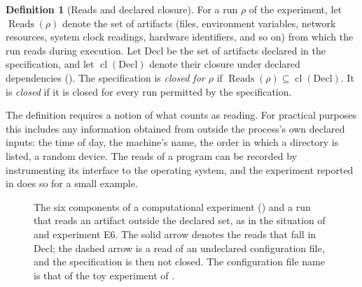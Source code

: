 \documentclass[11pt,twoside,openright]{book}
\theoremstyle{plain}
\theoremstyle{definition}
\newtheorem{definition}[theorem]{Definition}
\theoremstyle{remark}
\DeclareMathOperator{\Cl}{cl}
\DeclareMathOperator{\Rd}{Reads}
\begin{document}
\begin{definition}[Reads and declared closure]\label{def:reads}
For a run $\rho$ of the experiment, let $\Rd(\rho)$ denote the set of artifacts (files, environment variables, network resources, system clock readings, hardware identifiers, and so on) from which the run reads during execution. Let $\mathrm{Decl}$ be the set of artifacts declared in the specification, and let $\Cl(\mathrm{Decl})$ denote their closure under declared dependencies (). The specification is \emph{closed for $\rho$} if $\Rd(\rho)\subseteq\Cl(\mathrm{Decl})$. It is \emph{closed} if it is closed for every run permitted by the specification.
\end{definition}

The definition requires a notion of what counts as reading. For practical purposes this includes any information obtained from outside the process's own declared inputs: the time of day, the machine's name, the order in which a directory is listed, a random device. The reads of a program can be recorded by instrumenting its interface to the operating system, and the experiment reported in  does so for a small example.

\begin{figure}[t]
\centering
{}
\caption{The six components of a computational experiment () and a run that reads an artifact outside the declared set, as in the situation of  and experiment E6. The solid arrow denotes the reads that fall in $\mathrm{Decl}$; the dashed arrow is a read of an undeclared configuration file, and the specification is then not closed. The configuration file name is that of the toy experiment of .}
\label{fig:closure}
\end{figure}
\end{document}
